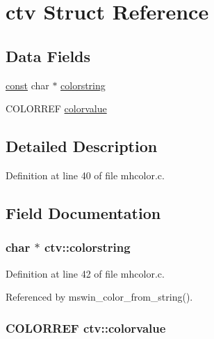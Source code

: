 \hypertarget{structctv}{\section{ctv Struct Reference}
\label{structctv}
}
\subsection*{Data Fields}
\begin{DoxyCompactItemize}
\item 
\hyperlink{tradstdc_8h_a2c212835823e3c54a8ab6d95c652660e}{const} char $\ast$ \hyperlink{structctv_a4185f1cf829623f079e60feb10d9995e}{colorstring}
\item 
C\+O\+L\+O\+R\+R\+E\+F \hyperlink{structctv_ad33d691d43f0fa0402011724fd4b2f04}{colorvalue}
\end{DoxyCompactItemize}


\subsection{Detailed Description}


Definition at line 40 of file mhcolor.\+c.



\subsection{Field Documentation}
\hypertarget{structctv_a4185f1cf829623f079e60feb10d9995e}{
\subsubsection[{colorstring}]{ char $\ast$ ctv\+::colorstring}}\label{structctv_a4185f1cf829623f079e60feb10d9995e}


Definition at line 42 of file mhcolor.\+c.



Referenced by mswin\+\_\+color\+\_\+from\+\_\+string().

\hypertarget{structctv_ad33d691d43f0fa0402011724fd4b2f04}{
\subsubsection[{colorvalue}]{\setlength{\rightskip}{0pt plus 5cm}C\+O\+L\+O\+R\+R\+E\+F ctv\+::colorvalue}}\label{structctv_ad33d691d43f0fa0402011724fd4b2f04}


